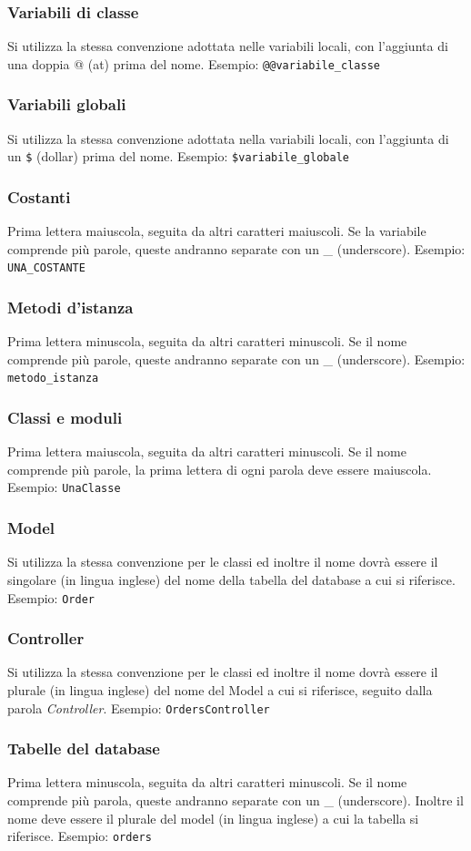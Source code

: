 \documentclass[11pt,a4paper]{article}
\begin{document}
\subsubsection*{Variabili di classe}
Si utilizza la stessa convenzione adottata nelle variabili locali, con l'aggiunta di una doppia @ (at) prima del nome. Esempio: \verb|@@variabile_classe|
\subsubsection*{Variabili globali}
Si utilizza la stessa convenzione adottata nella variabili locali, con l'aggiunta di un \verb|$| (dollar) prima del nome. Esempio: \verb|$variabile_globale|
\subsubsection*{Costanti}
Prima lettera maiuscola, seguita da altri caratteri maiuscoli. Se la variabile comprende più parole, queste andranno separate con un \_ (underscore). Esempio: \verb|UNA_COSTANTE|
\subsubsection*{Metodi d'istanza}
Prima lettera minuscola, seguita da altri caratteri minuscoli. Se il nome comprende più parole, queste andranno separate con un \_ (underscore). Esempio: \verb|metodo_istanza|
\subsubsection*{Classi e moduli}
Prima lettera maiuscola, seguita da altri caratteri minuscoli. Se il nome comprende più parole, la prima lettera di ogni parola deve essere maiuscola. Esempio: \verb|UnaClasse|
\subsubsection*{Model}
Si utilizza la stessa convenzione per le classi ed inoltre il nome dovrà essere il singolare (in lingua inglese) del nome della tabella del database a cui si riferisce. Esempio: \verb|Order|
\subsubsection*{Controller}
Si utilizza la stessa convenzione per le classi ed inoltre il nome dovrà essere il plurale (in lingua inglese) del nome del Model a cui si riferisce, seguito dalla parola \textit{Controller}. Esempio: \verb|OrdersController|
\subsubsection*{Tabelle del database}
Prima lettera minuscola, seguita da altri caratteri minuscoli. Se il nome comprende più parola, queste andranno separate con un \_ (underscore). Inoltre il nome deve essere il plurale del model (in lingua inglese) a cui la tabella si riferisce. Esempio: \verb|orders|
\end{document}
